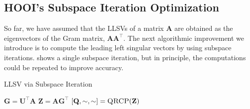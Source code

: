 \subsection{HOOI's Subspace Iteration Optimization} \label{sec:HOOI's Subspace Iteration Optimization}

    So far, we have assumed that the LLSVs of a matrix $\mathbf{A}$ are obtained
    as the eigenvectors of the Gram matrix, $\mathbf{A}\mathbf{A}^\intercal$.
    The next algorithmic improvement we introduce is to compute the leading left
    singular vectors by using subspace iterations.  shows a
    single subspace iteration, but in principle, the computations could be
    repeated to improve accuracy.

    \begin{algorithm}
        \caption{LLSV via Subspace Iteration}
        \label{alg:subiter}
        \begin{algorithmic}[1]
                \State $\mathbf{G} = \mathbf{U}^\intercal \mathbf{A} $ \label{line:SI-TTM}
                \State $\mathbf{Z} = \mathbf{A} \mathbf{G}^\intercal$ \label{line:SI-contract}
                \State $[\mathbf{Q}, \sim, \sim] = \Call{QRCP}{\mathbf{Z}}$ \label{line:SI-QRCP}
        \EndFunction
        \end{algorithmic}
    \end{algorithm}

